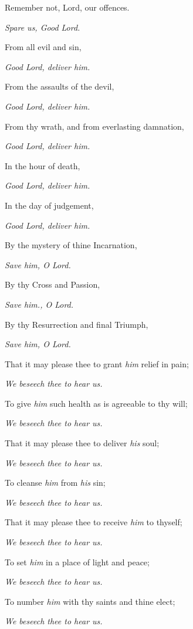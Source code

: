 Remember not, Lord, our offences.

\qquad\emph{Spare us, Good Lord.}

From all evil and sin,

\qquad\emph{Good Lord, deliver \emph{him.}}

From the assaults of the devil,

\qquad\emph{Good Lord, deliver \emph{him.}}

From thy wrath, and from everlasting damnation,

\qquad\emph{Good Lord, deliver \emph{him.}}

In the hour of death,

\qquad\emph{Good Lord, deliver \emph{him.}}

In the day of judgement,

\qquad\emph{Good Lord, deliver \emph{him.}}

By the mystery of thine Incarnation,

\qquad\emph{Save \emph{him}, O Lord.}

By thy Cross and Passion,

\qquad\emph{Save \emph{him.}, O Lord.}

By thy Resurrection and final Triumph,

\qquad\emph{Save \emph{him}, O Lord.}

That it may please thee to grant \emph{him} relief in pain;

\qquad\emph{We beseech thee to hear us.}

To give \emph{him} such health as is agreeable to thy will;

\qquad\emph{We beseech thee to hear us.}

That it may please thee to deliver \emph{his} soul;

\qquad\emph{We beseech thee to hear us.}

To cleanse \emph{him} from \emph{his} sin;

\qquad\emph{We beseech thee to hear us.}
    
That it may please thee to receive \emph{him} to thyself;

\qquad\emph{We beseech thee to hear us.}

To set \emph{him} in a place of light and peace;

\qquad\emph{We beseech thee to hear us.}

To number \emph{him} with thy saints and thine elect;

\qquad\emph{We beseech thee to hear us.}

